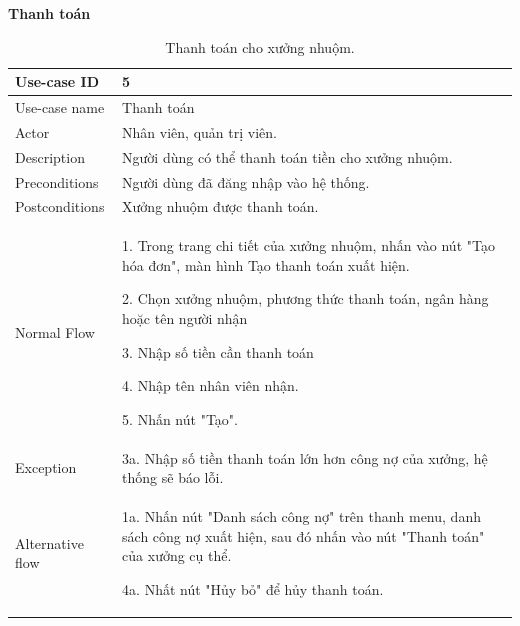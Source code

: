 \newpage
\textbf{Thanh toán}
\begin{table}[!htp]
    \centering
    \begin{tabular}{|m{3cm}|m{10cm}|}
    \hline 
        Use-case ID & 5\\ \hline
        Use-case name & Thanh toán\\ \hline
        Actor & Nhân viên, quản trị viên.\\ \hline
        Description & Người dùng có thể thanh toán tiền cho xưởng nhuộm.\\ \hline
        Preconditions & Người dùng đã đăng nhập vào hệ thống.\\ \hline
        Postconditions & Xưởng nhuộm được thanh toán.\\ \hline
        Normal Flow & 
        1. Trong trang chi tiết của xưởng nhuộm, nhấn vào nút "Tạo hóa đơn", màn hình Tạo thanh toán xuất hiện.\par
        2. Chọn xưởng nhuộm, phương thức thanh toán, ngân hàng hoặc tên người nhận\par
        3. Nhập số tiền cần thanh toán\par
        4. Nhập tên nhân viên nhận.\par
        5. Nhấn nút "Tạo".
        \\ \hline
        Exception & 
        3a. Nhập số tiền thanh toán lớn hơn công nợ của xưởng, hệ thống sẽ báo lỗi.
        \\ \hline
        Alternative flow & 
        1a. Nhấn nút "Danh sách công nợ" trên thanh menu, danh sách công nợ xuất hiện, sau đó nhấn vào nút "Thanh toán" của xưởng cụ thể.\par
        4a. Nhất nút "Hủy bỏ" để hủy thanh toán.
        \\ 
    \hline 
    \end{tabular}
    \caption{Thanh toán cho xưởng nhuộm.}
    \label{bang5}
\end{table}

